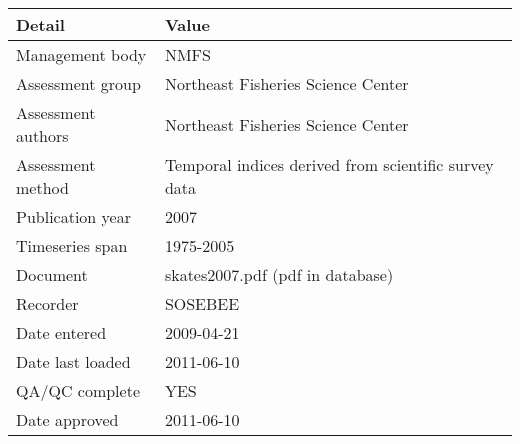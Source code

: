 \begin{table}[htb]
\centering
\begin{tabular}{lp{7cm}}
\toprule
Detail & Value \\
\midrule
Management body    & NMFS                                                 \\
Assessment group   & Northeast Fisheries Science Center                   \\
Assessment authors & Northeast Fisheries Science Center                   \\
Assessment method  & Temporal indices derived from scientific survey data \\
Publication year   & 2007                                                 \\
Timeseries span    & 1975-2005                                            \\
Document           & skates2007.pdf (pdf in database)                     \\
Recorder           & SOSEBEE                                              \\
Date entered       & 2009-04-21                                           \\
Date last loaded   & 2011-06-10                                           \\
QA/QC complete     & YES                                                  \\
Date approved      & 2011-06-10                                           \\
\bottomrule
\end{tabular}
\label{tab:assessdet}
\end{table}
